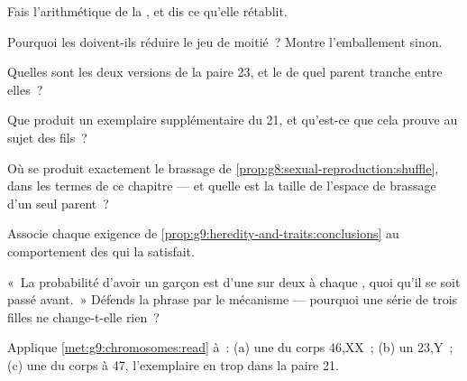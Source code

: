\begin{exercise}[$\star$]\label{exo:g9:chromosomes:3}
Fais l'arithmétique de la , et dis ce qu'elle
rétablit.
\end{exercise}

\begin{exercise}[$\star$]\label{exo:g9:chromosomes:4}
Pourquoi les  doivent-ils réduire le jeu de moitié~?
Montre l'emballement sinon.
\end{exercise}

\begin{exercise}[$\star$]\label{exo:g9:chromosomes:5}
Quelles sont les deux versions de la paire 23, et le 
de quel parent tranche entre elles~?
\end{exercise}

\begin{exercise}[$\star$]\label{exo:g9:chromosomes:6}
Que produit un exemplaire supplémentaire du  21,
et qu'est-ce que cela prouve au sujet des fils~?
\end{exercise}

\begin{exercise}[$\star\star$]\label{exo:g9:chromosomes:7}
Où se produit exactement le brassage de
\cref{prop:g8:sexual-reproduction:shuffle}, dans les termes
de ce chapitre --- et quelle est la taille de l'espace de
brassage d'un seul parent~?
\end{exercise}

\begin{exercise}[$\star\star$]\label{exo:g9:chromosomes:8}
Associe chaque exigence de
\cref{prop:g9:heredity-and-traits:conclusions} au
comportement des  qui la satisfait.
\end{exercise}

\begin{exercise}[$\star\star$]\label{exo:g9:chromosomes:9}
«~La probabilité d'avoir un garçon est d'une sur deux à
chaque , quoi qu'il se soit passé avant.~» Défends
la phrase par le mécanisme --- pourquoi une série de trois
filles ne change-t-elle rien~?
\end{exercise}

\begin{exercise}[$\star\star$]\label{exo:g9:chromosomes:10}
Applique \cref{met:g9:chromosomes:read} à~: (a) une 
du corps 46,XX~; (b) un  23,Y~; (c) une  du
corps à 47, l'exemplaire en trop dans la paire 21.
\end{exercise}

